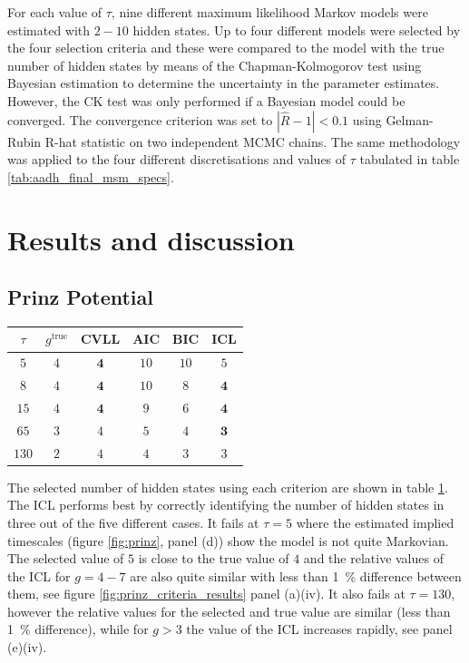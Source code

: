 For each value of $\tau$, nine different maximum likelihood Markov models were estimated with $2 - 10$ hidden states. Up to four different models were selected by the four selection criteria and these were compared to the model with the true number of hidden states by means of the Chapman-Kolmogorov test using Bayesian estimation to determine the uncertainty in the parameter estimates. However, the CK test was only performed if a Bayesian model could be converged. The convergence criterion was set to $|\hat{R}-1|<0.1$ using Gelman-Rubin R-hat statistic on two independent MCMC chains. The same methodology was applied to the four different discretisations and values of $\tau$ tabulated in table \ref{tab:aadh_final_msm_specs}. 


\section{Results and discussion}\label{sec:hmm_results}
\subsection{Prinz Potential}

\begin{table}
    \centering
    \begin{tabular}{|c|c|c|c|c|c|}
    \hline
    $\tau$ & $g^{\mathrm{true}}$ & CVLL & AIC & BIC & ICL  \\
    \hline\hline
     $5$  & $4$ & $\mathbf{4}$  & $10$ & $10$ & $5$ \\
     $8$  & $4$ & $\mathbf{4}$ & $10$ & $8$  & $\mathbf{4}$  \\
     $15$ & $4$ & $\mathbf{4}$  & $9$  & $6$  & $\mathbf{4}$  \\
     $65 $& $3$ & $4$  & $5$  & $4$  & $\mathbf{3}$  \\
     $130$& $2$ & $4$  & $4$  & $3$  & $3$  \\
     \hline
    \end{tabular}
    \label{tab:prinz_criteria_results}
\end{table}

The selected number of hidden states using each criterion are shown in table \ref{tab:prinz_criteria_results}.  The ICL performs best by correctly identifying the number of hidden states in three out of the five different cases. 
It fails at $\tau=5$ where the estimated implied timescales (figure \ref{fig:prinz}, panel (d)) show the model is not quite Markovian. The selected value of $5$ is close to the true value of $4$  and the relative values of the ICL for $g=4 - 7$ are also quite similar with less than \SI{1}{\percent} difference between them, see figure \ref{fig:prinz_criteria_results} panel (a)(iv). It also fails at $\tau=130$, however the relative values for the selected and true value are similar (less than \SI{1}{\percent} difference), while for $g>3$ the value of the ICL increases rapidly, see panel (e)(iv). 

